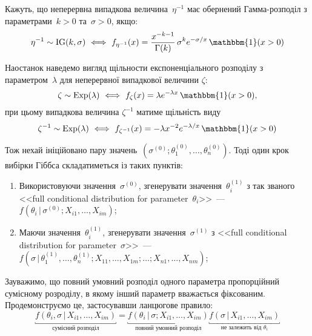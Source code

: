 Кажуть, що неперервна випадкова величина~$\eta^{-1}$ має обернений Гамма-розподіл з параметрами~$k>0$ та~$\sigma>0$, якщо:
\begin{equation}\label{task 5 - eq: dIG}
    \eta^{-1} \sim \mathrm{IG}(k,\sigma) \ \Longleftrightarrow \ f_{\eta^{-1}}(x) = \frac{x^{-k-1}}{\Gamma(k)}\,\sigma^{k} e^{-\sigma/x}\, \mathbbm{1}(x>0)
\end{equation}

Наостанок наведемо вигляд щільности експоненціального розподілу з параметром~$\lambda$ для неперервної випадкової величини $\zeta:$
\begin{equation}\label{task 5 - eq: dExp}
    \zeta \sim \mathrm{Exp}(\lambda) \ \Longleftrightarrow \ f_{\zeta}(x) = \lambda e^{-\lambda x}\, \mathbbm{1}(x>0),
\end{equation}
при цьому випадкова величина $\zeta^{-1}$ матиме щільність виду
\begin{equation}\label{task 5 - eq: dInvExp}
    \zeta^{-1} \sim \mathrm{Exp}(\lambda) \ \Longleftrightarrow \ f_{\zeta^{-1}}(x) = -\lambda x^{-2} e^{-\lambda/x}\, \mathbbm{1}(x>0)
\end{equation}

Тож нехай ініційовано пару значень~$\left( \sigma^{(0)};\theta_1^{(0)},\ldots,\theta_n^{(0)} \right)$. Тоді один крок вибірки Гіббса складатиметься із таких пунктів:
\begin{enumerate}
    \item Використовуючи значення~$\sigma^{(0)}$, згенерувати значення~$\theta_i^{(1)}$ з так званого <<full conditional distribution for parameter~$\theta_i$>>~--- $f(\theta_i \,|\, \sigma^{(0)}; X_{i1},\ldots,X_{im})$; 
    \item Маючи значення~$\theta_i^{(1)}$, згенерувати значення~$\sigma^{(1)}$ з <<full conditional distribution for parameter~$\sigma$>>~--- $f(\sigma \,|\, \theta_1^{(1)},\ldots,\theta_n^{(1)}; X_{11},\ldots,X_{1m};\ldots;X_{n1},\ldots,X_{nm})$; 
\end{enumerate}

Зауважимо, що повний умовний розподіл одного параметра пропорційний сумісному розроділу, в якому інший параметр вважається фіксованим. Продемонструємо це, застосувавши ланцюгове правило:
\begin{equation}\label{task 5 - eq: full theta conditional distribution}
    \underbracket{f(\theta_i, \sigma \,|\, X_{i1},\ldots,X_{im})}_{\text{сумісний розподіл}} = \underbracket{f(\theta_i \,|\, \sigma; X_{i1},\ldots,X_{im})}_{\text{повний умовний розподіл}} \underbracket{f(\sigma \,|\, X_{i1},\ldots,X_{im})}_{\text{не залежить від $\theta_i$}}
\end{equation}

